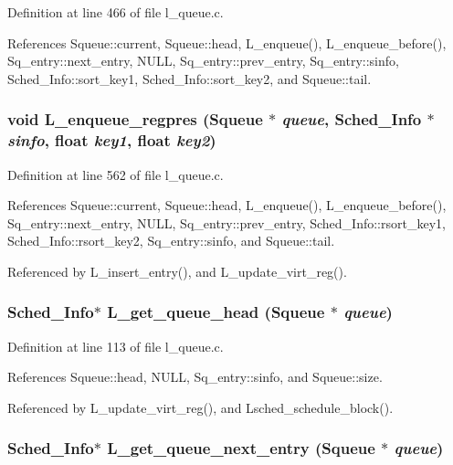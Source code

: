 Definition at line 466 of file l\_\-queue.c.

References Squeue::current, Squeue::head, L\_\-enqueue(), L\_\-enqueue\_\-before(), Sq\_\-entry::next\_\-entry, NULL, Sq\_\-entry::prev\_\-entry, Sq\_\-entry::sinfo, Sched\_\-Info::sort\_\-key1, Sched\_\-Info::sort\_\-key2, and Squeue::tail.
\subsubsection{\setlength{\rightskip}{0pt plus 5cm}void L\_\-enqueue\_\-regpres (\bf{Squeue} $\ast$ {\em queue}, \bf{Sched\_\-Info} $\ast$ {\em sinfo}, float {\em key1}, float {\em key2})}\label{l__queue_8c_8227bd45b0f57f5d6f07e6af4a46b1d6}




Definition at line 562 of file l\_\-queue.c.

References Squeue::current, Squeue::head, L\_\-enqueue(), L\_\-enqueue\_\-before(), Sq\_\-entry::next\_\-entry, NULL, Sq\_\-entry::prev\_\-entry, Sched\_\-Info::rsort\_\-key1, Sched\_\-Info::rsort\_\-key2, Sq\_\-entry::sinfo, and Squeue::tail.

Referenced by L\_\-insert\_\-entry(), and L\_\-update\_\-virt\_\-reg().
\subsubsection{\setlength{\rightskip}{0pt plus 5cm}\bf{Sched\_\-Info}$\ast$ L\_\-get\_\-queue\_\-head (\bf{Squeue} $\ast$ {\em queue})}\label{l__queue_8c_c6639a02ef45dc36a183e8e63332a728}




Definition at line 113 of file l\_\-queue.c.

References Squeue::head, NULL, Sq\_\-entry::sinfo, and Squeue::size.

Referenced by L\_\-update\_\-virt\_\-reg(), and Lsched\_\-schedule\_\-block().
\subsubsection{\setlength{\rightskip}{0pt plus 5cm}\bf{Sched\_\-Info}$\ast$ L\_\-get\_\-queue\_\-next\_\-entry (\bf{Squeue} $\ast$ {\em queue})}\label{l__queue_8c_40d01bb9c459ecfbff2e17481751f642}




